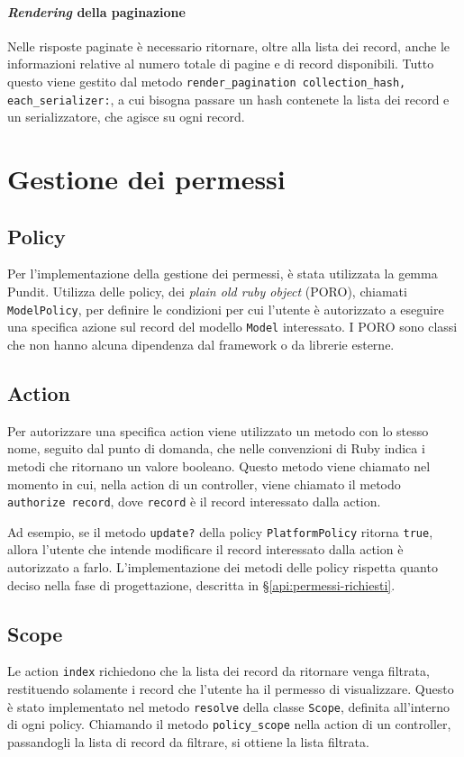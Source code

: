 \paragraph{\emph{Rendering} della paginazione} Nelle risposte paginate è necessario ritornare, oltre alla lista dei record, anche le informazioni relative al numero totale di pagine e di record disponibili. Tutto questo viene gestito dal metodo \texttt{render_pagination collection_hash,} \texttt{each_serializer:}, a cui bisogna passare un hash contenete la lista dei record e un serializzatore, che agisce su ogni record.


\section{Gestione dei permessi}
\subsection{Policy}
Per l'implementazione della gestione dei permessi, è stata utilizzata la gemma Pundit. Utilizza delle policy, dei \emph{plain old ruby object} (PORO), chiamati \verb|ModelPolicy|, per definire le condizioni per cui l'utente è autorizzato a eseguire una specifica azione sul record del modello \verb|Model| interessato. I PORO sono classi che non hanno alcuna dipendenza dal framework o da librerie esterne.

\subsection{Action}
Per autorizzare una specifica action viene utilizzato un metodo con lo stesso nome, seguito dal punto di domanda, che nelle convenzioni di Ruby indica i metodi che ritornano un valore booleano. Questo metodo viene chiamato nel momento in cui, nella action di un controller, viene chiamato il metodo \verb|authorize record|, dove \verb|record| è il record interessato dalla action.

Ad esempio, se il metodo \verb|update?| della policy \verb|PlatformPolicy| ritorna \verb|true|, allora l'utente che intende modificare il record interessato dalla action è autorizzato a farlo. L'implementazione dei metodi delle policy rispetta quanto deciso nella fase di progettazione, descritta in \S \ref{api:permessi-richiesti}.

\subsection{Scope}
Le action \verb|index| richiedono che la lista dei record da ritornare venga filtrata, restituendo solamente i record che l'utente ha il permesso di visualizzare. Questo è stato implementato nel metodo \verb|resolve| della classe \verb|Scope|, definita all'interno di ogni policy. Chiamando il metodo \verb|policy_scope| nella action di un controller, passandogli la lista di record da filtrare, si ottiene la lista filtrata.

